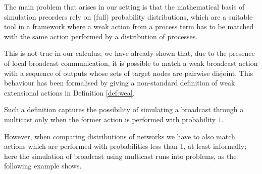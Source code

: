 \documentclass{LMCS}
\begin{document}
  The main problem that arises in our setting is that the  
  mathematical basis of simulation preorders rely on (full) probability distributions, which are a 
  suitable tool in a framework where a weak action from a process term has to be matched with the same 
  action performed by a distribution of processes.
  
  This is not true in our calculus; we have already shown that, due to
  the presence of local broadcast communication, it is possible to
  match a weak broadcast action with a sequence of outputs whose sets
  of target nodes are pairwise disjoint. This behaviour has been
  formalised by giving a non-standard  definition of weak extensional
  actions in Definition \ref{def:wea}. 
  
  Such a definition 
  captures the possibility of simulating a broadcast through a
  multicast only when the former action is performed with probability
  $1$.
  
  However, when comparing distributions of networks we have to
also match actions which are performed with probabilities less than 1, at least
informally; here the simulation of broadcast using multicast runs into problems,
as the following example shows.
\end{document}
